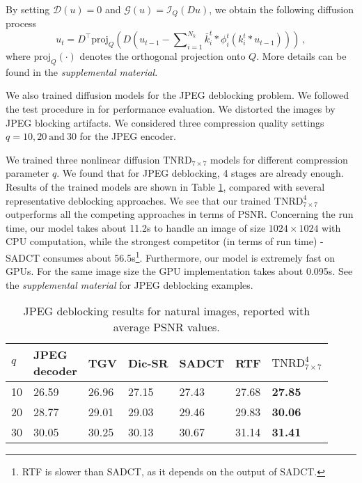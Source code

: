 \documentclass[10pt,journal,compsoc]{IEEEtran}
\newcommand{\cD}{\mathcal{D}}
\newcommand{\cG}{\mathcal{G}}
\newcommand{\cI}{\mathcal{I}}
\begin{document}
By setting $\cD(u) = 0$ and $\cG(u)  = \cI_{Q} (Du)$, we obtain the following 
diffusion process
\begin{equation}\label{deblocking}
u_t = D^\top \text{proj}_{Q}\left(D \left(u_{t-1} - \sum\nolimits_{i = 1}^{N_k}\bar k_i^t * \phi_i^t(k_i^t * u_{t-1})\right) \right) \,,
\end{equation}
where $\text{proj}_{Q}(\cdot)$ denotes the orthogonal projection onto $Q$. More details can be found in the 
\textit{supplemental material}. 

We also trained diffusion models for the JPEG deblocking problem. 
We followed the test procedure in \cite{ECCV2012RTF} for performance evaluation. 
We distorted the images by JPEG blocking artifacts. We considered 
three compression quality settings $q = 10, 20 ~\text{and} ~30$ for the JPEG encoder. 

We trained three nonlinear diffusion $\text{TNRD}_{7 \times 7}$ models for different compression parameter $q$. 
We found that for JPEG deblocking, 4 stages are already enough. Results of the trained models are shown in Table 
\ref{results}, compared with several representative deblocking approaches. 
We see that our trained $\text{TNRD}^4_{7 \times 7}$ outperforms all the 
competing approaches in terms of PSNR. {
Concerning the run time, our model takes about 11.2s 
to handle an image of size $1024 \times 1024$ with CPU computation, 
while the strongest competitor (in terms of run time) - SADCT 
consumes about 56.5s\footnote{
RTF is slower than SADCT, as it depends on the output of SADCT.}. 
Furthermore, our model is extremely fast on GPUs. 
For the same image size the GPU implementation takes about 0.095s.} 
See the \textit{supplemental material} for JPEG deblocking examples.
\begin{table}[t!]
\vspace*{0.25cm}
\centering
\hspace*{-0.15cm} \begin{tabular}{|l|L{0.8cm}|C{0.8cm}|C{0.9cm}|C{0.8cm}|C{0.9cm}|C{1.2cm}|}
\hline
$q$ & {\small JPEG \newline decoder} & \small TGV \newline \cite{BrediesH12}& \small Dic-SR\cite{TVdeblockingDic}
&\footnotesize SADCT \cite{foi2007pointwise} &\small RTF\cite{ECCV2012RTF} & \small $\text{TNRD}^4_{7 \times 7}$\\
\hline{} & 26.59 & 26.96 & 27.15 & 27.43 & {27.68} & \textbf{27.85}\\
 & 28.77 & 29.01 & 29.03 & 29.46 & {29.83} & \textbf{30.06}\\
 &  30.05 & 30.25 & 30.13 & 30.67 & {31.14} & \textbf{31.41}\\
\hline
\end{tabular}
\vspace*{0.2cm}
\caption{JPEG deblocking results for natural images, reported with average PSNR values.}\label{results}
\vspace*{-0.75cm}\end{table}
\end{document}
